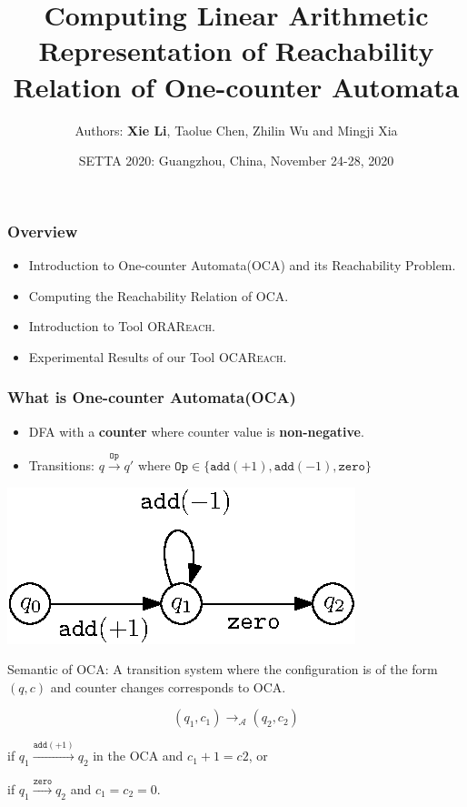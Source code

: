 \documentclass[11pt]{beamer}
\title{Computing Linear Arithmetic Representation of Reachability Relation  of One-counter Automata}
\author{
    Authors: \textbf{Xie Li}, Taolue Chen, Zhilin Wu and Mingji Xia
}
\date{SETTA 2020: Guangzhou, China, November 24-28, 2020}
\begin{document}
\maketitle
\begin{frame}\frametitle{Overview}
\begin{itemize}
\item Introduction to One-counter Automata(OCA) and its Reachability Problem.
\pause
\item Computing the Reachability Relation of OCA.

\item Introduction to Tool \textsc{ORAReach}.

\item Experimental Results of our Tool \textsc{OCAReach}.

\end{itemize}
\end{frame}


\begin{frame}\frametitle{What is One-counter Automata(OCA)}
\begin{itemize}

\item DFA with a \textbf{counter} where counter value is \textbf{non-negative}.

\item Transitions: $q\stackrel{\texttt{Op}}{\rightarrow} q'$ where $\texttt{Op}\in \{\texttt{add}(+1), \texttt{add}(-1), \texttt{zero}\}$
\end{itemize}
\begin{example}[OCA]
\begin{center}
\includegraphics[scale=1]{ocaexample.eps}
\end{center}


\end{example}
Semantic of OCA: A transition system where the configuration is of the form $(q,c)$ and counter changes corresponds to OCA.

\[(q_1, c_1) \rightarrow_\mathcal{A} (q_2,c_2)\]

if $q_1 \stackrel{\texttt{add}(+1)}{\longrightarrow} q_2$ in the OCA and $c_1 + 1 = c2$, or

if $q_1 \stackrel{\texttt{zero}}{\longrightarrow} q_2$ and $c_1 = c_2 = 0$.
\end{frame}
\end{document}
